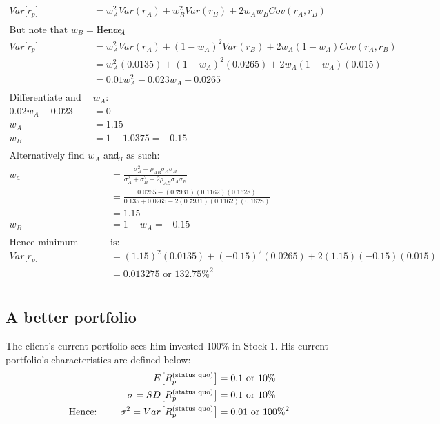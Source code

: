 \documentclass[12pt]{article}
\begin{document}
\subsection{}
\begin{align*}
	Var\big[r_p\big] &= w_A^2Var(r_A) + w_B^2Var(r_B) + 2w_Aw_B\textit{Cov}(r_A,r_B)\\
	&\\
	\text{But note that } w_B = 1-w_A& \text{ Hence:}\\
	Var\big[r_p\big] &= w_A^2Var(r_A) + (1-w_A)^2Var(r_B) + 2w_A(1-w_A)\textit{Cov}(r_A,r_B)\\
	&= w_A^2(0.0135) + (1-w_A)^2(0.0265) + 2w_A(1-w_A)(0.015)\\
	&= 0.01w_A^2 - 0.023w_A + 0.0265\\
	&\\
	\text{Differentiate and solve for }&\text{$w_A$:}\\
	0.02w_A - 0.023 &= 0\\
	w_A &= 1.15\\
	w_B &= 1-1.0375 = -0.15 \\
\end{align*}
\begin{align*}
	\text{Alternatively find $w_A$ and }&\text{$w_B$ as such:}\\
	w_a &= \frac{\sigma_B^2-\rho_{AB}\sigma_A\sigma_B}{\sigma_A^2+\sigma_B^2-2\rho_{AB}\sigma_A\sigma_B}\\
	&= \frac{0.0265-(0.7931)(0.1162)(0.1628)}{0.135+0.0265-2(0.7931)(0.1162)(0.1628)}\\
	&= 1.15\\
	w_B &= 1 - w_A = -0.15\\
	&\\
	\text{Hence minimum variance }&\text{is:}\\
	Var\big[r_p\big] &= (1.15)^2(0.0135) + (-0.15)^2(0.0265) + 2(1.15)(-0.15)(0.015)\\
	&= 0.013275 \text{ or } 132.75\%^2
\end{align*}

\section{}
\subsection{A better portfolio}
The client's current portfolio sees him invested 100\% in Stock 1. His current portfolio's characteristics are defined below:
\begin{align*}
	E\big[R_p^{\text{(status quo)}}\big] &= 0.1 \text{ or } 10\%\\
	\sigma = SD\big[R_p^{\text{(status quo)}}\big] &= 0.1 \text{ or } 10\%\\
	\text{Hence: \qquad}\sigma^2 = Var\big[R_p^{\text{(status quo)}}\big] &= 0.01 \text{ or } 100\%^2\\
\end{align*}
\end{document}

